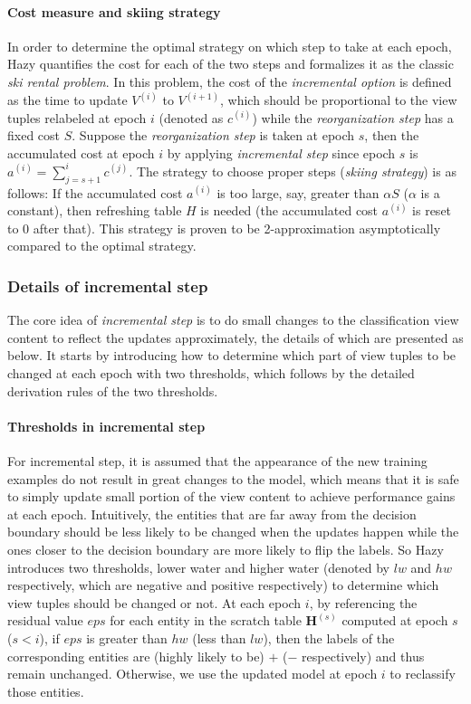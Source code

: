 \paragraph{Cost measure and skiing strategy} In order to determine the optimal strategy on which step to take at each epoch, Hazy quantifies the cost for each of the two steps and formalizes it as the classic {\em ski rental problem}. In this problem, the cost of the {\em incremental option} is defined as the time to update $V^{(i)}$ to $V^{(i+1)}$, which should be proportional to the view tuples relabeled at epoch $i$ (denoted as $c^{(i)}$) while the {\em reorganization step} has a fixed cost $S$. Suppose the {\em reorganization step} is taken at epoch $s$, then the accumulated cost at epoch $i$ by applying {\em incremental step} since epoch $s$ is $a^{(i)} = \sum_{j=s+1}^ic^{(j)}$. The strategy to choose proper steps ({\em skiing strategy}) is as follows: If the accumulated cost $a^{(i)}$ is too large, say, greater than $\alpha S$ ($\alpha$ is a constant), then refreshing table $H$ is needed (the accumulated cost $a^{(i)}$ is reset to 0 after that). This strategy is proven to be 2-approximation asymptotically compared to the optimal strategy.


\subsubsection{Details of incremental step}\label{Sec: incremental step}
The core idea of {\em incremental step} is to do small changes to the classification view content to reflect the updates approximately, the details of which are presented as below. It starts by introducing how to determine which part of view tuples to be changed at each epoch with two thresholds, which follows by the detailed derivation rules of the two thresholds.

\paragraph{Thresholds in incremental step}
For incremental step, it is assumed that the appearance of the new training examples do not result in great changes to the model, which means that it is safe to simply update small portion of the view content to achieve performance gains at each epoch. Intuitively, the entities that are far away from the decision boundary should be less likely to be changed when the updates happen while the ones closer to the decision boundary are more likely to flip the labels. So Hazy introduces two thresholds, lower water and higher water (denoted by $lw$ and $hw$ respectively, which are negative and positive respectively) to determine which view tuples should be changed or not. At each epoch $i$, by referencing the residual value $eps$ for each entity in the scratch table $\textbf{H}^{(s)}$ computed at epoch $s$ ($s<i$), if $eps$ is greater than $hw$ (less than $lw$), then the labels of the corresponding entities are (highly likely to be) $+$ ($-$ respectively) and thus remain unchanged. Otherwise, we use the updated model at epoch $i$ to reclassify those entities. 

